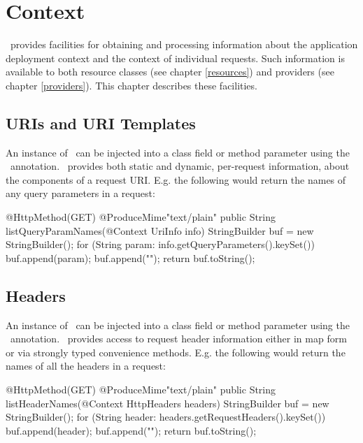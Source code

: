 \chapter{Context}
\label{context}

\jaxrs\ provides facilities for obtaining and processing information about the application deployment context and the context of individual requests. Such information is available to both resource classes (see chapter \ref{resources}) and providers (see chapter \ref{providers}). This chapter describes these facilities.

\section{URIs and URI Templates}

An instance of \UriInfo\ can be injected into a class field or method parameter using the \Context\ annotation. \UriInfo\ provides both static and dynamic, per-request information, about the components of a request URI. E.g. the following would return the names of any query parameters in a request:

\begin{listing}{1}
@HttpMethod(GET)
@ProduceMime{"text/plain"}
public String listQueryParamNames(@Context UriInfo info) {
  StringBuilder buf = new StringBuilder();
  for (String param: info.getQueryParameters().keySet()) {
    buf.append(param);
    buf.append("\n");
  }
  return buf.toString();
}
\end{listing} 

\section{Headers}

An instance of \HttpHeaders\ can be injected into a class field or method parameter using the \Context\ annotation. \HttpHeaders\ provides access to request header information either in map form or via strongly typed convenience methods. E.g. the following would return the names of all the headers in a request:

\begin{listing}{1}
@HttpMethod(GET)
@ProduceMime{"text/plain"}
public String listHeaderNames(@Context HttpHeaders headers) {
  StringBuilder buf = new StringBuilder();
  for (String header: headers.getRequestHeaders().keySet()) {
    buf.append(header);
    buf.append("\n");
  }
  return buf.toString();
}
\end{listing}

